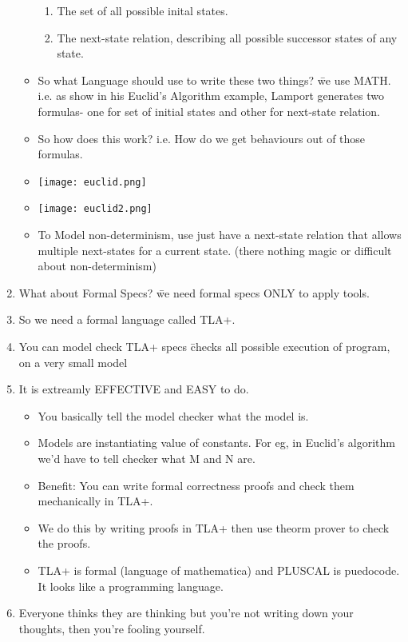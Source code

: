 \documentclass{article}
\begin{document}
\begin{enumerate}
\begin{itemize}
\begin{enumerate}
                \item The set of all possible inital states.
                \item The next-state relation, describing all possible successor states of any state. 
            \end{enumerate}
            \item So what Language should use to write these two things? \= we use MATH. i.e. as show in his Euclid's Algorithm example, Lamport generates two formulas- one for set of initial states and other for next-state relation. 
            \item So how does this work? i.e. How do we get behaviours out of those formulas.
            \item \texttt{[image: euclid.png]}
            \item \texttt{[image: euclid2.png]}
            \item To Model non-determinism, use just have a next-state relation that allows multiple next-states for a current state. (there nothing magic or difficult about non-determinism)
        \end{itemize}
        \item What about Formal Specs? \= we need formal specs ONLY to apply tools. 
        \item So we need a formal language called TLA+.
        \item You can model check TLA+ specs \= checks all possible execution of program, on a very small model
        \item It is extreamly EFFECTIVE and EASY to do. \begin{itemize}
            \item You basically tell the model checker what the model is.
            \item Models are instantiating value of constants. For eg, in Euclid's algorithm we'd have to tell checker what M and N are. 
            \item Benefit: You can write formal correctness proofs and check them mechanically in TLA+.
            \item We do this by writing proofs in TLA+ then use theorm prover to check the proofs.
            \item TLA+ is formal (language of mathematica) and PLUSCAL is puedocode. It looks like a programming language.
        \end{itemize}
        \item Everyone thinks they are thinking but you're not writing down your thoughts, then you're fooling yourself.

\end{enumerate}
\end{document}

